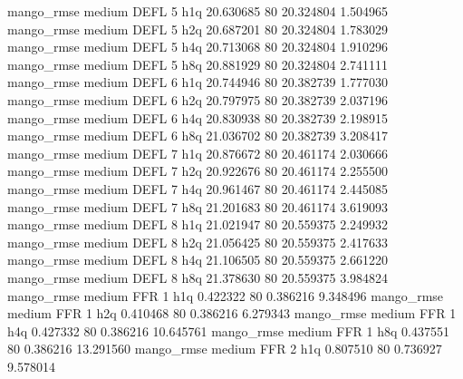        mango_rmse     medium     DEFL                 5                  h1q 20.630685 80      20.324804           1.504965
       mango_rmse     medium     DEFL                 5                  h2q 20.687201 80      20.324804           1.783029
       mango_rmse     medium     DEFL                 5                  h4q 20.713068 80      20.324804           1.910296
       mango_rmse     medium     DEFL                 5                  h8q 20.881929 80      20.324804           2.741111
       mango_rmse     medium     DEFL                 6                  h1q 20.744946 80      20.382739           1.777030
       mango_rmse     medium     DEFL                 6                  h2q 20.797975 80      20.382739           2.037196
       mango_rmse     medium     DEFL                 6                  h4q 20.830938 80      20.382739           2.198915
       mango_rmse     medium     DEFL                 6                  h8q 21.036702 80      20.382739           3.208417
       mango_rmse     medium     DEFL                 7                  h1q 20.876672 80      20.461174           2.030666
       mango_rmse     medium     DEFL                 7                  h2q 20.922676 80      20.461174           2.255500
       mango_rmse     medium     DEFL                 7                  h4q 20.961467 80      20.461174           2.445085
       mango_rmse     medium     DEFL                 7                  h8q 21.201683 80      20.461174           3.619093
       mango_rmse     medium     DEFL                 8                  h1q 21.021947 80      20.559375           2.249932
       mango_rmse     medium     DEFL                 8                  h2q 21.056425 80      20.559375           2.417633
       mango_rmse     medium     DEFL                 8                  h4q 21.106505 80      20.559375           2.661220
       mango_rmse     medium     DEFL                 8                  h8q 21.378630 80      20.559375           3.984824
       mango_rmse     medium      FFR                 1                  h1q  0.422322 80       0.386216           9.348496
       mango_rmse     medium      FFR                 1                  h2q  0.410468 80       0.386216           6.279343
       mango_rmse     medium      FFR                 1                  h4q  0.427332 80       0.386216          10.645761
       mango_rmse     medium      FFR                 1                  h8q  0.437551 80       0.386216          13.291560
       mango_rmse     medium      FFR                 2                  h1q  0.807510 80       0.736927           9.578014
